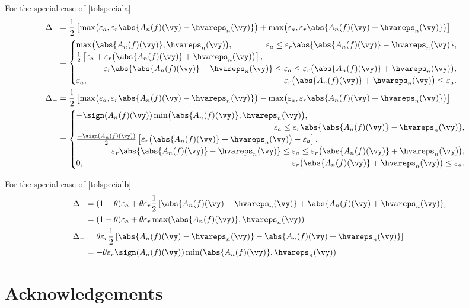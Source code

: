 \documentclass[]{elsarticle}
\theoremstyle{definition}
\theoremstyle{remark}
\begin{document}
For the special case of \eqref{tolspeciala}
\begin{align*}
\Delta_+ 
& = \frac{1}{2}\left[\max\bigl(\varepsilon_a,\varepsilon_r\abs{A_n(f)(\vy)-\hvareps_n(\vy)}\bigr) + \max\bigl(\varepsilon_a,\varepsilon_r\abs{A_n(f)(\vy)+\hvareps_n(\vy)}\bigr) \right] \\
& = \begin{cases} \max\bigl(\abs{A_n(f)(\vy)},\hvareps_n(\vy)\bigr), \qquad \qquad \hfill \hfill  \varepsilon_a \le \varepsilon_r \abs{ \abs{A_n(f)(\vy)} - \hvareps_n(\vy) },\\
\frac{1}{2}\left[\varepsilon_a + \varepsilon_r\bigl(\abs{A_n(f)(\vy)}+\hvareps_n(\vy)\bigr) \right], \\
\hfill \hfill \varepsilon_r \abs{ \abs{A_n(f)(\vy)} - \hvareps_n(\vy) } \le \varepsilon_a \le  \varepsilon_r \bigl( \abs{A_n(f)(\vy)} + \hvareps_n(\vy) \bigr),\\
\varepsilon_a, \hfill \hfill  \varepsilon_r \bigl( \abs{A_n(f)(\vy)} + \hvareps_n(\vy) \bigr) \le \varepsilon_a.
\end{cases}\\
\Delta_- 
& = \frac{1}{2}\left[\max\bigl(\varepsilon_a,\varepsilon_r\abs{A_n(f)(\vy)-\hvareps_n(\vy)}\bigr) - \max\bigl(\varepsilon_a,\varepsilon_r\abs{A_n(f)(\vy)+\hvareps_n(\vy)}\bigr) \right] \\
& = \begin{cases} -\sign(A_n(f)(\vy)) \min\bigl(\abs{A_n(f)(\vy)},\hvareps_n(\vy)\bigr), \\
\hfill \hfill \varepsilon_a \le \varepsilon_r \abs{ \abs{A_n(f)(\vy)} - \hvareps_n(\vy) },\\
\frac{-\sign(A_n(f)(\vy)) }{2}\left[\varepsilon_r\bigl(\abs{A_n(f)(\vy)}+\hvareps_n(\vy)\bigr) - \varepsilon_a\right], \\
\hspace{1.5cm}  \varepsilon_r \abs{ \abs{A_n(f)(\vy)} - \hvareps_n(\vy) } \le \varepsilon_a \le \varepsilon_r \bigl( \abs{A_n(f)(\vy)} + \hvareps_n(\vy) \bigr),\\
0, \hfill \hfill  \varepsilon_r \bigl( \abs{A_n(f)(\vy)} + \hvareps_n(\vy) \bigr) \le \varepsilon_a.
\end{cases}
\end{align*}

For the special case of \eqref{tolspecialb}
\begin{align*}
\Delta_+ 
& = (1-\theta)\varepsilon_a + \theta \varepsilon_r \frac{1}{2}\left[\abs{A_n(f)(\vy)-\hvareps_n(\vy)} + \abs{A_n(f)(\vy)+\hvareps_n(\vy)} \right] \\
& = (1-\theta)\varepsilon_a + \theta \varepsilon_r \max(\abs{A_n(f)(\vy)},\hvareps_n(\vy)) \\
\Delta_- 
& = \theta \varepsilon_r \frac{1}{2}\left[ \abs{A_n(f)(\vy)-\hvareps_n(\vy)} - \abs{A_n(f)(\vy) + \hvareps_n(\vy)} \right] \\
& = - \theta \varepsilon_r \sign(A_n(f)(\vy))\min(\abs{A_n(f)(\vy)},\hvareps_n(\vy))
\end{align*}


\section*{Acknowledgements} 



\end{document}
